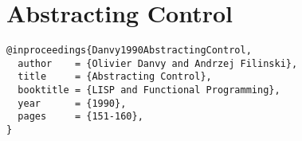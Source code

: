 \documentclass[letterpaper]{llncs}
\begin{document}
\section*{Abstracting Control}%

\begin{verbatim}
@inproceedings{Danvy1990AbstractingControl,
  author    = {Olivier Danvy and Andrzej Filinski},
  title     = {Abstracting Control},
  booktitle = {LISP and Functional Programming},
  year      = {1990},
  pages     = {151-160},
}
\end{verbatim}


%
%
%
\end{document}
